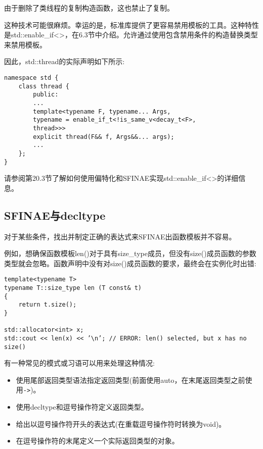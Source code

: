 \begin{tcolorbox}[colback=webgreen!5!white,colframe=webgreen!75!black]
\hspace*{0.75cm}由于删除了类线程的复制构造函数，这也禁止了复制。
\end{tcolorbox}

这种技术可能很麻烦。幸运的是，标准库提供了更容易禁用模板的工具。这种特性是std::enable\_if<>，在6.3节中介绍。允许通过使用包含禁用条件的构造替换类型来禁用模板。

因此，std::thread的实际声明如下所示:

\begin{lstlisting}[style=styleCXX]
namespace std {
	class thread {
		public:
		...
		template<typename F, typename... Args,
		typename = enable_if_t<!is_same_v<decay_t<F>,
		thread>>>
		explicit thread(F&& f, Args&&... args);
		...
	};
}
\end{lstlisting}

请参阅第20.3节了解如何使用偏特化和SFINAE实现std::enable\_if<>的详细信息。


\subsection{SFINAE与decltype}

对于某些条件，找出并制定正确的表达式来SFINAE出函数模板并不容易。

例如，想确保函数模板len()对于具有size\_type成员，但没有size()成员函数的参数类型就会忽略。函数声明中没有对size()成员函数的要求，最终会在实例化时出错:

\begin{lstlisting}[style=styleCXX]
template<typename T>
typename T::size_type len (T const& t)
{
	return t.size();
}

std::allocator<int> x;
std::cout << len(x) << ’\n’; // ERROR: len() selected, but x has no size()
\end{lstlisting}

有一种常见的模式或习语可以用来处理这种情况:

\begin{itemize}
\item 
使用尾部返回类型语法指定返回类型(前面使用auto，在末尾返回类型之前使用\texttt{->})。

\item 
使用decltype和逗号操作符定义返回类型。

\item 
给出以逗号操作符开头的表达式(在重载逗号操作符时转换为void)。

\item 
在逗号操作符的末尾定义一个实际返回类型的对象。
\end{itemize}


